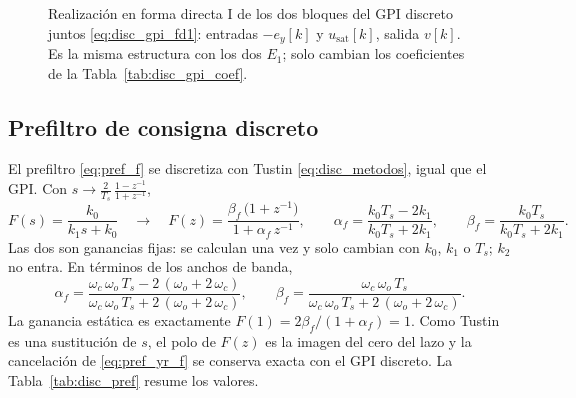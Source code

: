 \begin{figure}[H]
{%
  }
  \caption[Realización en forma directa I del GPI discreto]{Realización en
    forma directa I de los dos bloques del GPI discreto juntos
    \eqref{eq:disc_gpi_fd1}: entradas $-e_y[k]$ y $u_{\mathrm{sat}}[k]$,
    salida $v[k]$. Es la misma estructura con los dos $E_1$; solo cambian los
    coeficientes de la Tabla~\ref{tab:disc_gpi_coef}.}
  \label{fig:disc_formas_directas}
\end{figure}


\subsection{Prefiltro de consigna discreto}
\label{subsec:disc_prefiltro}

El prefiltro \eqref{eq:pref_f} se discretiza con Tustin \eqref{eq:disc_metodos}, igual que el GPI.
Con $s \to \frac{2}{T_s}\,\frac{1 - z^{-1}}{1 + z^{-1}}$,
\begin{equation}
F(s) = \frac{k_0}{k_1 s + k_0}
\quad\longrightarrow\quad
F(z) = \frac{\beta_f\,\bigl(1 + z^{-1}\bigr)}{1 + \alpha_f\,z^{-1}},
\qquad
\alpha_f = \frac{k_0 T_s - 2 k_1}{k_0 T_s + 2 k_1},
\qquad
\beta_f = \frac{k_0 T_s}{k_0 T_s + 2 k_1} .
\label{eq:disc_pref_tf}
\end{equation}
Las dos son ganancias fijas: se calculan una vez y solo cambian con $k_0$, $k_1$ o $T_s$; $k_2$ no
entra. En términos de los anchos de banda,
\begin{equation}
\alpha_f = \frac{\omega_c\,\omega_o\,T_s - 2\,(\omega_o + 2\,\omega_c)}{\omega_c\,\omega_o\,T_s + 2\,(\omega_o + 2\,\omega_c)},
\qquad
\beta_f = \frac{\omega_c\,\omega_o\,T_s}{\omega_c\,\omega_o\,T_s + 2\,(\omega_o + 2\,\omega_c)} .
\end{equation}
La ganancia estática es exactamente $F(1) = 2\beta_f/(1 + \alpha_f) = 1$. Como Tustin es una
sustitución de $s$, el polo de $F(z)$ es la imagen del cero del lazo y la cancelación de
\eqref{eq:pref_yr_f} se conserva exacta con el GPI discreto. La Tabla~\ref{tab:disc_pref} resume los
valores.

